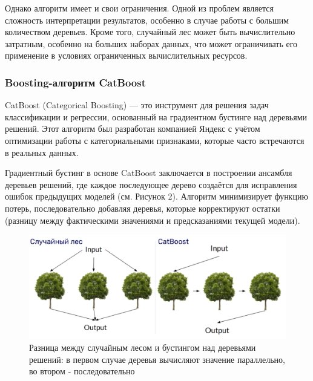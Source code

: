 \documentclass[spec, och, diploma]{SCWorks}
\begin{document}
            Однако алгоритм имеет и свои ограничения. Одной из проблем
            является сложность интерпретации результатов, особенно в случае
            работы с большим количеством деревьев. Кроме того, случайный лес
            может быть вычислительно затратным, особенно на больших наборах
            данных, что может ограничивать его применение в условиях
            ограниченных вычислительных ресурсов.

        \subsubsection{Boosting-алгоритм CatBoost}
        
            CatBoost (Categorical Boosting) — это инструмент для решения задач
            классификации и регрессии, основанный на градиентном бустинге над
            деревьями решений. Этот алгоритм был разработан компанией Яндекс с
            учётом оптимизации работы с категориальными признаками, которые
            часто встречаются в реальных данных.
            
            Градиентный бустинг в основе CatBoost заключается в построении
            ансамбля деревьев решений, где каждое последующее дерево создаётся
            для исправления ошибок предыдущих моделей (см. Рисунок 2). Алгоритм
            минимизирует функцию потерь, последовательно добавляя деревья,
            которые корректируют остатки (разницу между фактическими значениями
            и предсказаниями текущей модели). \cite{catboost} 

            \begin{figure}[H]
                \centering
                \includegraphics[width=1\textwidth]{pic/forestnboosting.png}
                \caption{Разница между случайным лесом и бустингом над деревьями решений: в первом случае деревья вычисляют значение параллельно, во втором - последовательно}
            \end{figure}
\end{document}
